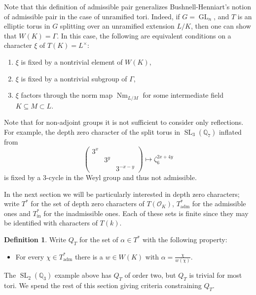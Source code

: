 \documentclass{amsart}
\theoremstyle{plain}
\theoremstyle{definition}
\newtheorem{definition}[theorem]{Definition}
\numberwithin{equation}{section}
\DeclareMathOperator{\Nm}{Nm}
\DeclareMathOperator{\GL}{GL}
\DeclareMathOperator{\SL}{SL}
\newcommand{\OK}{\mathcal{O}_K}
\newcommand{\QQ}{\mathbb{Q}}
\newcommand{\Lx}{L^\times}
\newcommand{\Thadm}{T^*_{\operatorname{adm}}}
\newcommand{\Thinadm}{T^*_{\operatorname{in}}}
\newcommand{\hatT}{T^*}
\begin{document}
Note that this definition of admissible pair generalizes
Bushnell-Henniart's notion of admissible pair \cite{bushnell-henniart:10a} in
the case of unramified tori.  Indeed,
if $G = \GL_n$, and $T$ is an elliptic torus in $G$ splitting over
an unramified extension $L/K$, then one can show that
$W(K) = \Gamma$.  In this case, the following are equivalent conditions
on a character $\xi$ of $T(K) = \Lx$:
\begin{enumerate}
\item $\xi$ is fixed by a nontrivial element of $W(K)$,
\item $\xi$ is fixed by a nontrivial subgroup of $\Gamma$,
\item $\xi$ factors through the norm map $\Nm_{L/M}$ for some intermediate field $K \subseteq M \subset L$.
\end{enumerate}

Note that for non-adjoint groups it is not sufficient to consider only reflections.
For example, the depth zero character of the split torus in $\SL_3(\QQ_7)$ inflated from
$$\begin{pmatrix} 3^x & & \\ & 3^y & \\ & & 3^{-x-y} \end{pmatrix} \mapsto \zeta_6^{2x + 4y}$$
is fixed by a 3-cycle in the Weyl group and thus not admissible.

In the next section we will be particularly interested in depth zero characters; write $\hatT$ for the set of
depth zero characters of $T(\OK)$, $\Thadm$ for the admissible
ones and $\Thinadm$ for the inadmissible ones.  Each of these
sets is finite since they may be identified with characters of $T(k)$.

\begin{definition}
Write $Q_T$ for the set of $\alpha \in \hatT$ with the following property:
\begin{itemize}
\item For every $\chi \in \Thadm$ there is a $w \in W(K)$ with $\alpha = \frac{\chi}{w(\chi)}$.
\end{itemize}
\end{definition}

The $\SL_2(\QQ_3)$ example above has $Q_T$ of order two, but $Q_T$ is trivial for most tori.
We spend the rest of this section giving criteria constraining $Q_T$.
\end{document}
